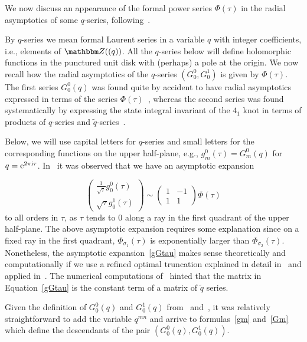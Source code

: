 \documentclass[12pt,reqno]{amsart}
\theoremstyle{definition}
\def\BZ{\mathbbm Z}
\def\s{\sigma}
\def\tq{\tilde{q}}
\def\ri{\mathrm{i}}
\def\re{{\rm e}}
\def\ri{{\rm i}}
\begin{document}
We now discuss an appearance of the formal power series $\Phi(\tau)$
in the radial asymptotics of some $q$-series, following~\cite{GZ:qseries}.

By $q$-series we mean formal Laurent series in a variable $q$ with
integer coefficients, i.e., elements of $\BZ((q))$.  All the
$q$-series below will define holomorphic functions in the punctured
unit disk with (perhaps) a pole at the origin.  We now recall how the
radial asymptotics of the $q$-series $(G^0_0,G^1_0)$ is given by
$\Phi(\tau)$. The first series $G^0_0(q)$ was found quite by accident
to have radial asymptotics expressed in terms of the series
$\Phi(\tau)$~\cite{GZ:qseries}, whereas the second series was found
systematically by expressing the state integral invariant of the $4_1$
knot in terms of products of $q$-series and
$\tq$-series~\cite{GK:qseries}.

Below, we will use capital letters for $q$-series and small letters
for the corresponding functions on the upper half-plane, e.g.,
$g^0_m(\tau)=G^0_m(q)$ for $q=\re^{2\pi
  \ri\tau}$. In~\cite{GZ:qseries} it was observed that we have an
asymptotic expansion

\begin{equation}
\label{gGtau}
\begin{pmatrix} \frac{1}{\sqrt{\tau}} g^0_0(\tau) \\
  \sqrt{\tau} g^1_0(\tau)
\end{pmatrix} \sim \begin{pmatrix} 1 & -1 \\ 1 & 1 \end{pmatrix}
  \Phi( \tau) 
\end{equation}
%
to all orders in $\tau$, as $\tau$ tends to $0$ along a ray in the
first quadrant of the upper half-plane. The above asymptotic expansion
requires some explanation since on a fixed ray in the first quadrant,
$\Phi_{\s_1}( \tau)$ is exponentially larger than
$\Phi_{\s_2}(\tau)$. Nonetheless, the asymptotic
expansion~\eqref{gGtau} makes sense theoretically and computationally
if we use a refined optimal truncation explained in detail
in~\cite{GZ:kashaev} and applied in~\cite{GZ:qseries}. The numerical
computations of~\cite{GZ:qseries} hinted that the matrix in
Equation~\eqref{gGtau} is the constant term of a matrix of $\tq$
series.

Given the definition of $G^0_0(q)$ and $G^1_0(q)$ from~\cite{GZ:qseries}
and~\cite{GK:qseries}, it was relatively straightforward to add the
variable $q^{m n}$ and arrive to formulas~\eqref{gm} and~\eqref{Gm}
which define the descendants of the pair $(G^0_0(q),G^1_0(q))$.
\end{document}
